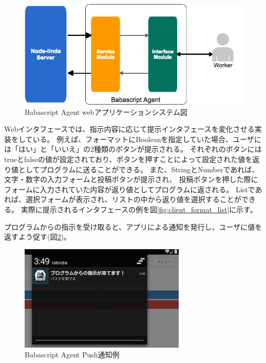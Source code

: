 \begin{figure}[htbp]
  \begin{center}
  \includegraphics[width=.8\linewidth,bb=0 0 675 312]{images/webapp-system.png}
  \end{center}
  \caption{Babascript Agent webアプリケーションシステム図}
  \label{fig:client-overview}
\end{figure}

Webインタフェースでは、指示内容に応じて提示インタフェースを変化させる実装をしている。
例えば、フォーマットにBooleanを指定していた場合、ユーザには「はい」と「いいえ」の2種類のボタンが提示される。
それぞれのボタンにはtrueとfalseの値が設定されており、ボタンを押すことによって設定された値を返り値としてプログラムに送ることができる。
また、StringとNumberであれば、文字・数字の入力フォームと投稿ボタンが提示され、
投稿ボタンを押した際にフォームに入力されていた内容が返り値としてプログラムに返される。
Listであれば、選択フォームが表示され、リストの中から返り値を選択することができる。
実際に提示されるインタフェースの例を図\ref{fig:client_format_list}に示す。

プログラムからの指示を受け取ると、アプリによる通知を発行し、ユーザに値を返すよう促す(図\ref{fig:client-push-notification})。

\begin{figure}[htbp]
  \begin{center}
  \includegraphics[width=.5\linewidth,bb=0 0 300 192]{images/client-push-notification.png}
  \end{center}
  \caption{Babascript Agent Push通知例}
  \label{fig:client-push-notification}
\end{figure}

